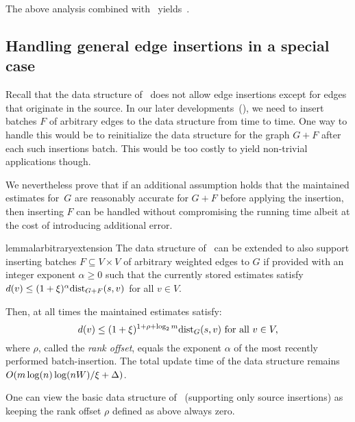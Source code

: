 \documentclass[11pt,letterpaper]{article}
\theoremstyle{plain}
\renewcommand{\O}{O}
\newcommand{\dist}{\mathrm{dist}}
\begin{document}
The above analysis combined with~ yields~.
\subsection{Handling general edge insertions in a special case}\label{sec:reset}
Recall that the data structure of~ does not allow edge insertions except
for edges that originate in the source. 
In our later developments~(), we need to insert batches $F$ of arbitrary edges
to the data structure from time to time.
One way to handle this would be to reinitialize the data structure for the graph $G+F$ after each such insertions batch.
This would be too costly to yield non-trivial applications though.

We nevertheless prove that if an additional assumption holds that
the maintained estimates for~$G$ are reasonably accurate for $G+F$ before applying the insertion,
then inserting $F$ can be handled without compromising the running time 
albeit at the cost of introducing additional error.
\newcommand{\roff}{\rho}
\begin{restatable}{lemma}{larbitraryextension}\label{l:arbitrary-extension}
The data structure of~ can be extended to also support
inserting batches $F\subseteq V\times V$ of arbitrary weighted edges to $G$ if provided with an integer exponent $\alpha\geq 0$ such that
the currently stored estimates satisfy
$d(v)\leq (1+\epsp)^{\alpha}\dist_{G+F}(s,v)$ for all $v\in V$.

Then, at all times the maintained estimates satisfy:
\[ d(v)\leq (1+\epsp)^{1+\roff+\log_2{m}} \dist_G(s,v)\text{ for all }v\in V, \]
where $\roff$, called the \emph{rank offset}, equals the exponent $\alpha$ of the most recently performed batch-insertion. The total
update time of the data structure remains $\O(m\log(n)\log(nW)/\epsp+\Delta)$.
\end{restatable}
One can view the basic data structure of~ (supporting only source insertions) as keeping the rank offset $\roff$ defined as above always zero.
\end{document}
